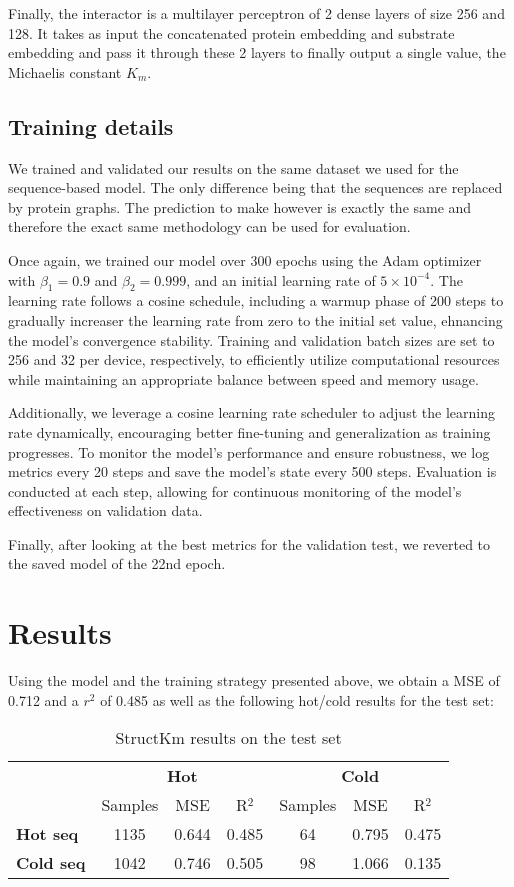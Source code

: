 Finally, the interactor is a multilayer perceptron of 2 dense layers of size 256 and 128. It takes as input the
concatenated protein embedding and substrate embedding and pass it through these 2 layers to finally output a single
value, the Michaelis constant $K_m$.

\subsection{Training details}

We trained and validated our results on the same dataset we used for the sequence-based model. The only difference
being that the sequences are replaced by protein graphs. The prediction to make however is exactly the same and 
therefore the exact same methodology can be used for evaluation.

Once again, we trained our model over 300 epochs using the Adam optimizer with $\beta_1=0.9$ and $\beta_2=0.999$, and an initial
learning rate of $5\times10^{-4}$. The learning rate follows a cosine schedule, including a warmup phase of 200
steps to gradually increaser the learning rate from zero to the initial set value, ehnancing the model's convergence
stability. Training and validation batch sizes are set to 256 and 32 per device, respectively, to efficiently
utilize computational resources while maintaining an appropriate balance between speed and memory usage. 

Additionally, we leverage a cosine learning rate scheduler to adjust the learning rate dynamically, 
encouraging better fine-tuning and generalization as training progresses. To monitor the model's performance 
and ensure robustness, we log metrics every 20 steps and save the model's state every 500 steps. 
Evaluation is conducted at each step, allowing for continuous monitoring of the model's effectiveness on 
validation data. 

Finally, after looking at the best metrics for the validation test, we reverted to the saved model of the
 22nd epoch. 

 \section{Results}

 Using the model and the training strategy presented above, we obtain a MSE of 0.712 and a $r^2$ of 0.485 
 as well as the following hot/cold results for the test set:

 \begin{table}[ht]
  \centering
  \begin{tabular}{lcccccc}
  \hline
   & \multicolumn{3}{c}{\textbf{Hot}} & \multicolumn{3}{c}{\textbf{Cold}} \\
   & Samples & MSE & R\(^2\) & Samples & MSE & R\(^2\) \\ \hline
  \textbf{Hot seq}  & 1135 & 0.644 & 0.485 & 64 & 0.795 & 0.475 \\
  \textbf{Cold seq} & 1042 & 0.746 & 0.505 & 98 & 1.066 & 0.135 \\ \hline
  \end{tabular}
  \caption{StructKm results on the test set}
  \label{tab:summary_performance}
\end{table}

